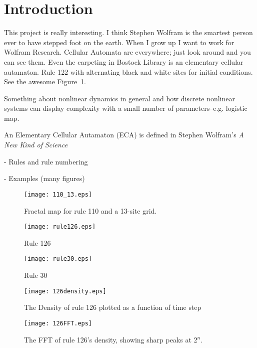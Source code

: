 \section{Introduction}

This project is really interesting.
I think Stephen Wolfram is the smartest person ever to have stepped
foot on the earth.
When I grow up I want to work for Wolfram Research.
Cellular Automata are everywhere; just look around and you can see
them.
Even the carpeting in Bostock Library is an elementary cellular
autamaton.
Rule 122 with alternating black and white sites for initial
conditions.
See the awesome Figure~\ref{110_map}.

Something about nonlinear dynamics in general and how discrete
nonlinear systems can display complexity with a small number of
parameters--e.g. logistic map.

An Elementary Cellular Autamaton (ECA) is defined in Stephen Wolfram's
\emph{A New Kind of Science}~\cite{anks}

- Rules and rule numbering

- Examples (many figures)

\begin{figure}
\centering
\texttt{[image: 110\_13.eps]}
\caption{\label{110_map} Fractal map for rule 110 and a 13-site grid.}
\end{figure}

\begin{figure}
 \begin{minipage}[b]{0.49\textwidth}
  \centering
  \texttt{[image: rule126.eps]}
  \caption{\label{rule126} Rule 126}
 \end{minipage}
 \hspace{0.5cm}
 \begin{minipage}[b]{0.49\textwidth}
  \centering
  \texttt{[image: rule30.eps]}
  \caption{\label{rule30} Rule 30}
 \end{minipage}
\end{figure}


\begin{figure}
 \begin{minipage}[b]{0.49\textwidth}
  \centering
  \texttt{[image: 126density.eps]}
  \caption{\label{126density} The Density of rule 126 plotted as a function of time step}
 \end{minipage}
 \hspace{0.5cm}
 \begin{minipage}[b]{0.49\textwidth}
  \centering
  \texttt{[image: 126FFT.eps]}
  \caption{\label{126FFT} The FFT of rule 126's density, showing sharp peaks at 2$^n$.}
 \end{minipage}
\end{figure}


